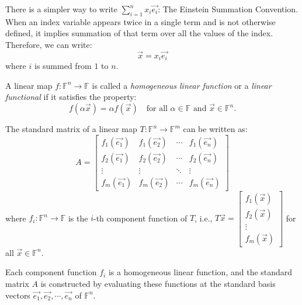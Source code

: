 \documentclass[
	11pt, %
	fleqn, %
	a4paper, %
]{LegrandOrangeBook}
\newcommand{\F}{\mathbb{F}} %
\begin{document}
There is a simpler way to write $\sum_{i=1}^{n} x_i \vec{e_i}$: The Einstein Summation Convention. When an index variable appears twice in a single term and is not otherwise defined, it implies summation of that term over all the values of the index. Therefore, we can write:
\[
    \vec{x} = x_i \vec{e_i}
\]
where $i$ is summed from $1$ to $n$. 

\begin{definition}
    A linear map $f: \F^n \to \F$ is called a \emph{homogeneous linear function} or a \emph{linear functional} if it satisfies the property:
    \[
        f(\alpha \vec{x}) = \alpha f(\vec{x}) \quad \text{for all } \alpha \in \F \text{ and } \vec{x} \in \F^n.
    \]
\end{definition}

\begin{corollary}
    The standard matrix of a linear map $T: \F^n \to \F^m$ can be written as:
    \[
        A = \begin{bmatrix}
            f_1(\vec{e_1}) & f_1(\vec{e_2}) & \cdots & f_1(\vec{e_n}) \\
            f_2(\vec{e_1}) & f_2(\vec{e_2}) & \cdots & f_2(\vec{e_n}) \\
            \vdots & \vdots & \ddots & \vdots \\
            f_m(\vec{e_1}) & f_m(\vec{e_2}) & \cdots & f_m(\vec{e_n})
        \end{bmatrix}
    \]
    where $f_i: \F^n \to \F$ is the $i$-th component function of $T$, i.e., $T\vec{x} = \begin{bmatrix}
        f_1(\vec{x}) \\
        f_2(\vec{x}) \\
        \vdots \\
        f_m(\vec{x})
    \end{bmatrix}$ for all $\vec{x} \in \F^n$.
\end{corollary}

\begin{remark}
    Each component function $f_i$ is a homogeneous linear function, and the standard matrix $A$ is constructed by evaluating these functions at the standard basis vectors $\vec{e_1}, \vec{e_2}, \cdots, \vec{e_n}$ of $\F^n$.
\end{remark}
\end{document}
